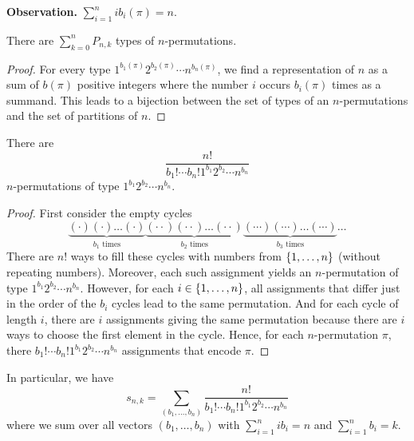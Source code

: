 \documentclass[language=english]{../../Template/TemplateLecture}
\begin{document}
\textbf{Observation.} $\sum_{i = 1}^n ib_i(\pi) = n$.

\begin{prop}
    There are $\sum_{k = 0}^n P_{n,k}$ types of $n$-permutations.
\end{prop}
\begin{proof}
    For every type $1^{b_1(\pi)}2^{b_2(\pi)}\cdots n^{b_n(\pi)}$, we find a representation of $n$ as a sum of $b(\pi)$ positive integers where the number $i$ occurs $b_i(\pi)$ times as a summand. This leads to a bijection between the set of types of an $n$-permutations and the set of partitions of $n$.
\end{proof}

\begin{prop}
    There are 
    \begin{equation}
        \frac{n!}{b_1!\cdots b_n! 1^{b_1} 2^{b_2} \cdots n^{b_n}}
    \end{equation}
    $n$-permutations of type $1^{b_1} 2^{b_2} \cdots n^{b_n}$.
\end{prop}
\begin{proof}
    First consider the empty cycles 
    \begin{equation}
        \underset{\text{$b_1$ times}}{\underbrace{(\cdot)(\cdot)\ldots(\cdot)}}\underset{\text{$b_2$ times}}{\underbrace{(\cdot\cdot)(\cdot\cdot)\ldots(\cdot\cdot)}}\underset{\text{$b_3$ times}}{\underbrace{(\cdots)(\cdots)\ldots(\cdots)}}\ldots
    \end{equation}
    There are $n!$ ways to fill these cycles with numbers from $\{1,\ldots,n\}$ (without repeating numbers). Moreover, each such assignment yields an $n$-permutation of type $1^{b_1} 2^{b_2} \cdots n^{b_n}$. However, for each $i \in \{1,\ldots,n\}$, all assignments that differ just in the order of the $b_i$ cycles lead to the same permutation. 
    And for each cycle of length $i$, there are $i$ assignments giving the same permutation because there are $i$ ways to choose the first element in the cycle. Hence, for each $n$-permutation $\pi$, there $b_1!\cdots b_n! 1^{b_1} 2^{b_2} \cdots n^{b_n}$ assignments that encode $\pi$.
\end{proof}

In particular, we have 
\begin{equation}
    s_{n,k} = \sum_{(b_1,\ldots,b_n)}\frac{n!}{b_1!\cdots b_n! 1^{b_1} 2^{b_2} \cdots n^{b_n}}
\end{equation}
where we sum over all vectors $(b_1,\ldots,b_n)$ with $\sum_{i = 1}^n ib_i = n$ and $\sum_{i = 1}^n b_i = k$.
\end{document}
